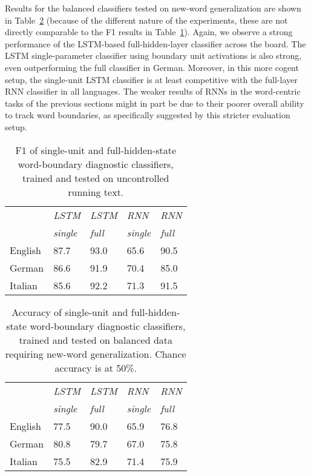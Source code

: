 Results for the balanced classifiers tested on new-word
generalization are shown in Table~\ref{tab:segmentation-results}
(because of the different nature of the experiments, these
are not directly comparable to the F1 results in Table~\ref{tab:segmentation-results-real}). Again, we
observe a strong performance of the LSTM-based full-hidden-layer
classifier across the board. The LSTM
single-parameter classifier using boundary unit activations is also strong,  even outperforming the full classifier in German. %
Moreover, in this more cogent setup, the single-unit LSTM classifier
is at least competitive with the full-layer RNN classifier in all languages. The weaker
results of RNNs in the word-centric tasks of the previous sections
might in part be due to their poorer overall ability to track word boundaries,
as specifically suggested by this stricter evaluation setup. %

\begin{table}[t]
	\small
  \begin{center}
    \begin{tabular}{l|l|l|l|l|}
      \multicolumn{1}{c|}{}&\emph{LSTM}&\emph{LSTM}&\emph{RNN}&\emph{RNN}\\
            \multicolumn{1}{c|}{}&\emph{single}&\emph{full}&\emph{single}&\emph{full}\\
      \hline
	    English & 87.7 & 93.0 &  65.6  & 90.5 \\ 
	    German  & 86.6 & 91.9 &  70.4  & 85.0 \\ 
	    Italian & 85.6 & 92.2 &  71.3  & 91.5 \\ 
    \end{tabular}
  \end{center}
  \caption{\label{tab:segmentation-results-real} F1 of single-unit and full-hidden-state word-boundary diagnostic classifiers, trained and tested on uncontrolled running text.}
\end{table}

\begin{table}[t]
	\small
  \begin{center}
    \begin{tabular}{l|l|l|l|l|}
      \multicolumn{1}{c|}{}&\emph{LSTM}&\emph{LSTM}&\emph{RNN}&\emph{RNN}\\
            \multicolumn{1}{c|}{}&\emph{single}&\emph{full}&\emph{single}&\emph{full}\\
      \hline
      English & 77.5& 90.0 & 65.9  & 76.8\\ 
      German  & 80.8& 79.7 & 67.0  & 75.8\\ 
      Italian & 75.5& 82.9 & 71.4  & 75.9\\ 
    \end{tabular}
  \end{center}
  \caption{\label{tab:segmentation-results} Accuracy of  single-unit and full-hidden-state word-boundary diagnostic classifiers, trained and tested on balanced data requiring new-word generalization. Chance accuracy is at 50\%.}
\end{table}

